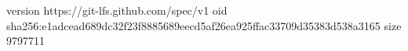 version https://git-lfs.github.com/spec/v1
oid sha256:e1adcead689dc32f23f8885689eecd5af26ea925ffac33709d35383d538a3165
size 9797711

